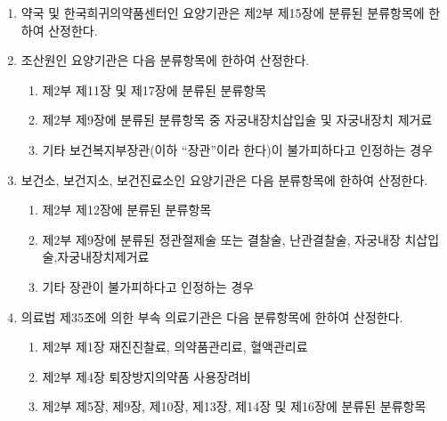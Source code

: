 \begin{enumerate}[1.]
\item 약국 및 한국희귀의약품센터인 요양기관은 제2부 제15장에 분류된 분류항목에 한하여 산정한다.
\item 조산원인 요양기관은 다음 분류항목에 한하여 산정한다.
	\begin{enumerate}[가.]\tightlist
	\item 제2부 제11장 및 제17장에 분류된 분류항목
	\item 제2부 제9장에 분류된 분류항목 중 자궁내장치삽입술 및 자궁내장치 제거료
	\item 기타 보건복지부장관(이하 “장관”이라 한다)이 불가피하다고 인정하는 경우
	\end{enumerate}
\item 보건소, 보건지소, 보건진료소인 요양기관은 다음 분류항목에 한하여 산정한다.
	\begin{enumerate}[가.]\tightlist
	\item 제2부 제12장에 분류된 분류항목
	\item 제2부 제9장에 분류된 정관절제술 또는 결찰술, 난관결찰술, 자궁내장 치삽입술,자궁내장치제거료
	\item 기타 장관이 불가피하다고 인정하는 경우
	\end{enumerate}
\item 의료법 제35조에 의한 부속 의료기관은 다음 분류항목에 한하여 산정한다.
	\begin{enumerate}[가.]\tightlist
	\item 제2부 제1장 재진진찰료, 의약품관리료, 혈액관리료
	\item 제2부 제4장 퇴장방지의약품 사용장려비
	\item 제2부 제5장, 제9장, 제10장, 제13장, 제14장 및 제16장에 분류된 분류항목
	\end{enumerate}	
\end{enumerate}

